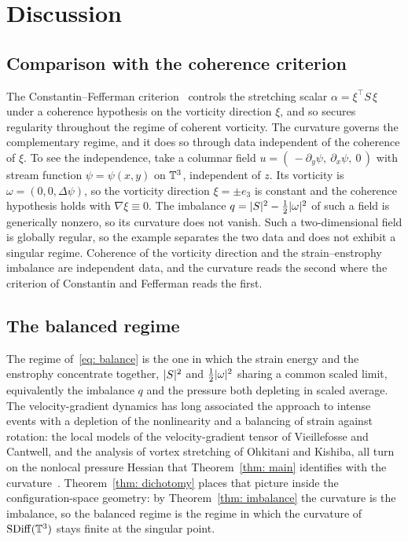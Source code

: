 \section{Discussion}
\label{sec: discussion}

\subsection{Comparison with the coherence criterion}

The Constantin--Fefferman criterion~\cite{constantin-1993-dir-vor-pro} controls
the stretching scalar $\alpha = \xi^{\top} S\,\xi$ under a coherence hypothesis on
the vorticity direction $\xi$, and so secures regularity throughout the regime of
coherent vorticity. The curvature governs the complementary regime, and it does
so through data independent of the coherence of $\xi$. To see the independence,
take a columnar field $u = (\,-\partial_y\psi,\ \partial_x\psi,\ 0\,)$ with stream
function $\psi = \psi(x,y)$ on $\mathbb{T}^3$, independent of $z$. Its vorticity is
$\omega = (0,0,\Delta\psi)$, so the vorticity direction $\xi = \pm e_3$ is
constant and the coherence hypothesis holds with $\nabla\xi \equiv 0$. The
imbalance $q = \lvert S \rvert^2 - \tfrac12\lvert \omega \rvert^2$ of such a field is generically
nonzero, so its curvature does not vanish. Such a two-dimensional field is globally
regular, so the example separates the two data and does not exhibit a singular
regime. Coherence of the vorticity direction and the strain--enstrophy imbalance
are independent data, and the curvature reads the second where the criterion of
Constantin and Fefferman reads the first.

\subsection{The balanced regime}

The regime of~\eqref{eq: balance} is the one in which the strain energy and the
enstrophy concentrate together, $\lvert S \rvert^2$ and $\tfrac12\lvert \omega \rvert^2$ sharing a
common scaled limit, equivalently the imbalance $q$ and the pressure both
depleting in scaled average. The velocity-gradient dynamics has long associated
the approach to intense events with a depletion of the nonlinearity and a
balancing of strain against rotation: the local models of the velocity-gradient
tensor of Vieillefosse and Cantwell, and the analysis of vortex stretching of
Ohkitani and Kishiba, all turn on the nonlocal pressure Hessian that
Theorem~\ref{thm: main} identifies with the curvature~\cite{vieillefosse-1982-loc-int,
cantwell-1992-exa-sol, ohkitani-1995-non-nat, constantin-1994-geo-sta-tur}.
Theorem~\ref{thm: dichotomy} places that picture inside the configuration-space
geometry: by Theorem~\ref{thm: imbalance} the curvature is the imbalance, so the
balanced regime is the regime in which the curvature of $\operatorname{SDiff}(\mathbb{T}^3)$ stays finite
at the singular point.

